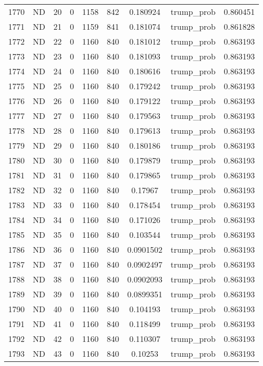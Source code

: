 \documentclass[12pt,a4paper]{article}
\begin{document}
\begin{tabular}{r|cccccccc}
	1770 & ND & 20 & 0 & 1158 & 842 & 0.180924 & trump\_prob & 0.860451 \\
	1771 & ND & 21 & 0 & 1159 & 841 & 0.181074 & trump\_prob & 0.861828 \\
	1772 & ND & 22 & 0 & 1160 & 840 & 0.181012 & trump\_prob & 0.863193 \\
	1773 & ND & 23 & 0 & 1160 & 840 & 0.181093 & trump\_prob & 0.863193 \\
	1774 & ND & 24 & 0 & 1160 & 840 & 0.180616 & trump\_prob & 0.863193 \\
	1775 & ND & 25 & 0 & 1160 & 840 & 0.179242 & trump\_prob & 0.863193 \\
	1776 & ND & 26 & 0 & 1160 & 840 & 0.179122 & trump\_prob & 0.863193 \\
	1777 & ND & 27 & 0 & 1160 & 840 & 0.179563 & trump\_prob & 0.863193 \\
	1778 & ND & 28 & 0 & 1160 & 840 & 0.179613 & trump\_prob & 0.863193 \\
	1779 & ND & 29 & 0 & 1160 & 840 & 0.180186 & trump\_prob & 0.863193 \\
	1780 & ND & 30 & 0 & 1160 & 840 & 0.179879 & trump\_prob & 0.863193 \\
	1781 & ND & 31 & 0 & 1160 & 840 & 0.179865 & trump\_prob & 0.863193 \\
	1782 & ND & 32 & 0 & 1160 & 840 & 0.17967 & trump\_prob & 0.863193 \\
	1783 & ND & 33 & 0 & 1160 & 840 & 0.178454 & trump\_prob & 0.863193 \\
	1784 & ND & 34 & 0 & 1160 & 840 & 0.171026 & trump\_prob & 0.863193 \\
	1785 & ND & 35 & 0 & 1160 & 840 & 0.103544 & trump\_prob & 0.863193 \\
	1786 & ND & 36 & 0 & 1160 & 840 & 0.0901502 & trump\_prob & 0.863193 \\
	1787 & ND & 37 & 0 & 1160 & 840 & 0.0902497 & trump\_prob & 0.863193 \\
	1788 & ND & 38 & 0 & 1160 & 840 & 0.0902093 & trump\_prob & 0.863193 \\
	1789 & ND & 39 & 0 & 1160 & 840 & 0.0899351 & trump\_prob & 0.863193 \\
	1790 & ND & 40 & 0 & 1160 & 840 & 0.104193 & trump\_prob & 0.863193 \\
	1791 & ND & 41 & 0 & 1160 & 840 & 0.118499 & trump\_prob & 0.863193 \\
	1792 & ND & 42 & 0 & 1160 & 840 & 0.110307 & trump\_prob & 0.863193 \\
	1793 & ND & 43 & 0 & 1160 & 840 & 0.10253 & trump\_prob & 0.863193 \\

\end{tabular}
\end{document}
